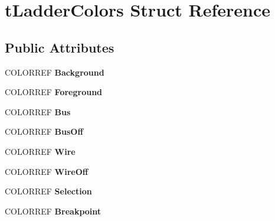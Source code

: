 \hypertarget{structt_ladder_colors}{\section{t\-Ladder\-Colors Struct Reference}
\label{structt_ladder_colors}
}
\subsection*{Public Attributes}
\begin{DoxyCompactItemize}
\item 
\hypertarget{structt_ladder_colors_aba2451c1474eb83146440b18c5467a39}{C\-O\-L\-O\-R\-R\-E\-F {\bfseries Background}}\label{structt_ladder_colors_aba2451c1474eb83146440b18c5467a39}

\item 
\hypertarget{structt_ladder_colors_af078bee47d8f1b7ab9f2de78e81b392d}{C\-O\-L\-O\-R\-R\-E\-F {\bfseries Foreground}}\label{structt_ladder_colors_af078bee47d8f1b7ab9f2de78e81b392d}

\item 
\hypertarget{structt_ladder_colors_a51a15ee4ca7e3100f67f405d7f9805ce}{C\-O\-L\-O\-R\-R\-E\-F {\bfseries Bus}}\label{structt_ladder_colors_a51a15ee4ca7e3100f67f405d7f9805ce}

\item 
\hypertarget{structt_ladder_colors_a33f2f3e8a38627ebdb8be8ebe0eb6db5}{C\-O\-L\-O\-R\-R\-E\-F {\bfseries Bus\-Off}}\label{structt_ladder_colors_a33f2f3e8a38627ebdb8be8ebe0eb6db5}

\item 
\hypertarget{structt_ladder_colors_aa52e5cac0a792263a854ffa1d85947c3}{C\-O\-L\-O\-R\-R\-E\-F {\bfseries Wire}}\label{structt_ladder_colors_aa52e5cac0a792263a854ffa1d85947c3}

\item 
\hypertarget{structt_ladder_colors_a9e3c3988e5b3be96f6aa4f4b8dc0623b}{C\-O\-L\-O\-R\-R\-E\-F {\bfseries Wire\-Off}}\label{structt_ladder_colors_a9e3c3988e5b3be96f6aa4f4b8dc0623b}

\item 
\hypertarget{structt_ladder_colors_ab59354a616d8a8722b99ef8d4b8c2b69}{C\-O\-L\-O\-R\-R\-E\-F {\bfseries Selection}}\label{structt_ladder_colors_ab59354a616d8a8722b99ef8d4b8c2b69}

\item 
\hypertarget{structt_ladder_colors_a98a2512b20d65d41264e09eb409ebdb4}{C\-O\-L\-O\-R\-R\-E\-F {\bfseries Breakpoint}}\label{structt_ladder_colors_a98a2512b20d65d41264e09eb409ebdb4}


\end{DoxyCompactItemize}
